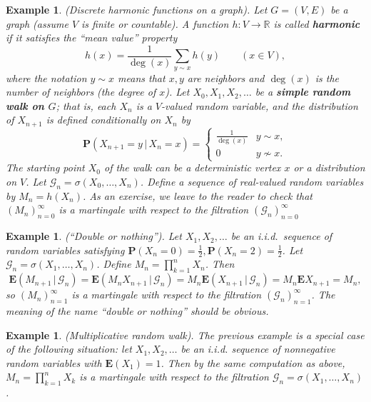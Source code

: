 \documentclass[12pt]{article}
\newcommand{\R}{\mathbb{R}}
\newcommand{\prob}{\mathbf{P}}
\newcommand{\expec}{\mathbf{E}}
\newcommand{\condexp}[2]{\expec\left(#1\,|\,#2\right)}
\theoremstyle{example}
\newtheorem{example}[thm]{Example}
\begin{document}
\begin{example} (Discrete harmonic functions on a graph). Let $G=(V,E)$ be a graph (assume $V$ is finite or countable). A function $h:V\to\R$ is called \textbf{harmonic} if it satisfies the ``mean value'' property
$$ h(x) = \frac{1}{\operatorname{deg}(x)}\sum_{y \sim x} h(y) \qquad (x\in V), $$
where the notation $y\sim x$ means that $x,y$ are neighbors and $\operatorname{deg}(x)$ is the number of neighbors (the degree of $x$).
Let $X_0,X_1,X_2,\ldots$ be a \textbf{simple random walk on $G$}; that is, each $X_n$ is a $V$-valued random variable, and the distribution of $X_{n+1}$ is defined conditionally on $X_n$ by
$$ \prob(X_{n+1} = y\,|\,X_n=x) = \begin{cases} \frac{1}{\operatorname{deg}(x)} & y\sim x, \\ 0 & y\nsim x.
\end{cases}
$$
The starting point $X_0$ of the walk can be a deterministic vertex $x$ or a distribution on $V$. Let $\mathcal{G}_n=\sigma(X_0,\ldots,X_n)$. Define a sequence of real-valued random variables by $M_n = h(X_n)$. 
As an exercise, we leave to the reader to check that 
$(M_n)_{n=0}^\infty$ is a martingale with respect to the filtration $(\mathcal{G}_n)_{n=0}^\infty$
\end{example}

\begin{example} (``Double or nothing''). Let $X_1,X_2,\ldots $ be an i.i.d.\ sequence of random variables satisfying
$ \prob(X_n = 0) = \tfrac12, \prob(X_n = 2) = \tfrac12$. Let $\mathcal{G}_n=\sigma(X_1,\ldots,X_n)$. Define $M_n = \prod_{k=1}^n X_n$. Then
$$ \condexp{M_{n+1}}{\mathcal{G}_{n}} = \condexp{M_{n} X_{n+1}}{\mathcal{G}_n} = M_{n} \condexp{X_{n+1}}{\mathcal{G}_n} = M_{n} \expec{X_{n+1}} = M_n, $$
so $(M_n)_{n=1}^\infty$ is a martingale with respect to the filtration $(\mathcal{G}_n)_{n=1}^\infty$. The meaning of the name ``double or nothing'' should be obvious.
\end{example}

\begin{example} (Multiplicative random walk). The previous example is a special case of the following situation: let $X_1, X_2, \ldots $ be an i.i.d. sequence of nonnegative random variables with $\expec(X_1)=1$. Then by the same computation as above, $M_n = \prod_{k=1}^n X_k$ is a martingale with respect to the filtration $\mathcal{G}_n = \sigma(X_1,\ldots,X_n)$.
\end{example}
\end{document}
